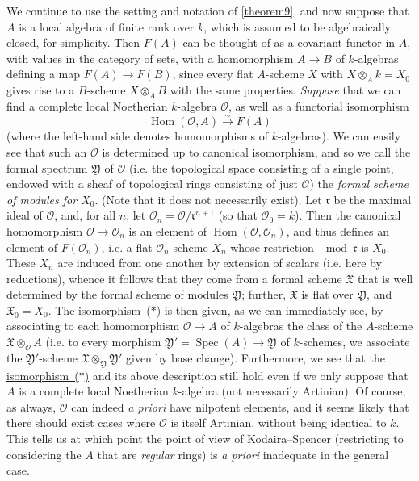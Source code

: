 \documentclass{article}
\theoremstyle{plain}
\theoremstyle{definition}
\newcommand{\sh}{\mathscr}
\newcommand{\cat}{\mathcal}
\newcommand{\fk}{\mathfrak}
\DeclareMathOperator{\Spec}{Spec}
\DeclareMathOperator{\Hom}{Hom}
\begin{document}
We continue to use the setting and notation of \cref{theorem9}, and now suppose that $A$ is a local algebra of finite rank over $k$, which is assumed to be algebraically closed, for simplicity.
Then $F(A)$ can be thought of as a covariant functor in $A$, with values in the category of sets, with a homomorphism $A\to B$ of $k$-algebras defining a map $F(A)\to F(B)$, since every flat $A$-scheme $X$ with $X\otimes_Ak=X_0$ gives rise to a $B$-scheme $X\otimes_AB$ with the same properties.
\emph{Suppose} that we can find a complete local Noetherian $k$-algebra $\cat{O}$, as well as a functorial isomorphism
\[
  \label{isomorphism*}
  \Hom(\cat{O},A) \xrightarrow{\sim} F(A)
  \tag{$*$}
\]
(where the left-hand side denotes homomorphisms of $k$-algebras).
We can easily see that such an $\cat{O}$ is determined up to canonical isomorphism, and so we call the formal spectrum $\fk{Y}$ of $\cat{O}$ (i.e. the topological space consisting of a single point, endowed with a sheaf of topological rings consisting of just $\cat{O}$) the \emph{formal scheme of modules for $X_0$}.
(Note that it does not necessarily exist).
Let $\fk{r}$ be the maximal ideal of $\cat{O}$, and, for all $n$, let $\sh{O}_n=\cat{O}/\fk{r}^{n+1}$ (so that $\sh{O}_0=k$).
Then the canonical homomorphism $\cat{O}\to\sh{O}_n$ is an element of $\Hom(\cat{O},\sh{O}_n)$, and thus defines an element of $F(\sh{O}_n)$, i.e. a flat $\sh{O}_n$-scheme $X_n$ whose restriction $\mod\fk{r}$ is $X_0$.
These $X_n$ are induced from one another by extension of scalars (i.e. here by reductions), whence it follows that they come from a formal scheme $\fk{X}$ that is well determined by the formal scheme of modules $\fk{Y}$;
further, $\fk{X}$ is flat over $\fk{Y}$, and $\fk{X}_0=X_0$.
The \hyperref[isomorphism*]{isomorphism~($*$)} is then given, as we can immediately see, by associating to each homomorphism $\cat{O}\to A$ of $k$-algebras the class of the $A$-scheme $\fk{X}\otimes_{\cat{O}} A$ (i.e. to every morphism $\fk{Y}'=\Spec(A)\to\fk{Y}$ of $k$-schemes, we associate the $\fk{Y}'$-scheme $\fk{X}\otimes_{\fk{Y}}\fk{Y}'$ given by base change).
Furthermore, we see that the \hyperref[isomorphism*]{isomorphism~($*$)} and its above description still hold even if we only suppose that $A$ is a complete local Noetherian $k$-algebra (not necessarily Artinian).
Of course, as always, $\cat{O}$ can indeed \emph{a priori} have nilpotent elements, and it seems likely that there should exist cases where $\cat{O}$ is itself Artinian, without being identical to $k$.
This tells us at which point the point of view of Kodaira--Spencer (restricting to considering the $A$ that are \emph{regular} rings) is \emph{a priori} inadequate in the general case.
\end{document}
